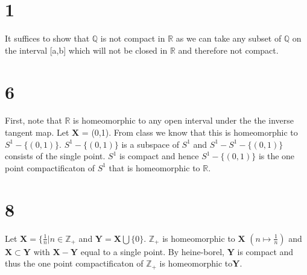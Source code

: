 \documentclass[a4paper, 12pt]{article}
\begin{document}
\section*{1}
It suffices to show that $\mathbb{Q}$ is not compact in $\mathbb{R}$ as we can take any subset of $\mathbb{Q}$ on the interval [a,b] which will not be closed in $\mathbb{R}$ and therefore not compact.

\section*{6}
First, note that $\mathbb{R}$ is homeomorphic to any open interval under the the inverse tangent map. Let $\mathbf{X}$ = (0,1). From class we know that this is homeomorphic to $S^1 - \{(0,1)\}$. $S^1 - \{(0,1)\}$ is a subspace of $S^1$ and $S^1 - S^1 - \{(0,1)\}$ consists of the single point. $S^1$ is compact and hence $S^1 - \{(0,1)\}$ is the one point compactificaton of $S^1$ that is homeomorphic to $\mathbb{R}$.
\section*{8}
Let $\mathbf{X} = \{\frac{1}{n} | n \in \mathbb{Z_+}$ and $\mathbf{Y} = \mathbf{X} \bigcup \{0\}$. $\mathbb{Z_+}$ is homeomorphic to $\mathbf{X}$ $(n \mapsto \frac{1}{n})$ and $\mathbf{X} \subset \mathbf{Y}$ with $\mathbf{X} - \mathbf{Y}$ equal to a single point. By heine-borel, $\mathbf{Y}$ is compact and thus the one point compactificaton of $\mathbb{Z_+}$ is homeomorphic to$\mathbf{Y}$. 
\end{document}
